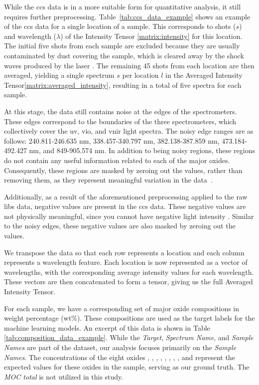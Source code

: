 While the \gls{ccs} data is in a more suitable form for quantitative analysis, it still requires further preprocessing. Table~\ref{tab:ccs_data_example} shows an example of the \gls{ccs} data for a single location of a sample. This corresponds to shots ($s$) and wavelength ($\lambda$) of the Intensity Tensor \ref{matrix:intensity} for this location.
The initial five shots from each sample are excluded because they are usually contaminated by dust covering the sample, which is cleared away by the shock waves produced by the laser \cite{cleggRecalibrationMarsScience2017}.
The remaining 45 shots from each location are then averaged, yielding a single spectrum $s$ per location $l$ in the Averaged Intensity Tensor\ref{matrix:averaged_intensity}, resulting in a total of five spectra for each sample. 

At this stage, the data still contains noise at the edges of the spectrometers.
These edges correspond to the boundaries of the three spectrometers, which collectively cover the \gls{uv}, \gls{vio}, and \gls{vnir} light spectra.
The noisy edge ranges are as follows: 240.811-246.635 nm, 338.457-340.797 nm, 382.138-387.859 nm, 473.184-492.427 nm, and 849-905.574 nm.
In addition to being noisy regions, these regions do not contain any useful information related to each of the major oxides.
Consequently, these regions are masked by zeroing out the values, rather than removing them, as they represent meaningful variation in the data~\cite{cleggRecalibrationMarsScience2017}.

Additionally, as a result of the aforementioned preprocessing applied to the raw \gls{libs} data, negative values are present in the \gls{ccs} data.
These negative values are not physically meaningful, since you cannot have negative light intensity \cite{p9_paper}.
Similar to the noisy edges, these negative values are also masked by zeroing out the values.

We transpose the data so that each row represents a location and each column represents a wavelength feature. 
Each location is now represented as a vector of wavelengths, with the corresponding average intensity values for each wavelength. 
These vectors are then concatenated to form a tensor, giving us the full Averaged Intensity Tensor.

For each sample, we have a corresponding set of major oxide compositions in weight percentage (wt\%).
These compositions are used as the target labels for the machine learning models.
An excerpt of this data is shown in Table \ref{tab:composition_data_example}.
While the \textit{Target}, \textit{Spectrum Name}, and \textit{Sample Names} are part of the dataset, our analysis focuses primarily on the \textit{Sample Names}.
The concentrations of the eight oxides , , , , , , , , and  represent the expected values for these oxides in the sample, serving as our ground truth. The \textit{MOC total} is not utilized in this study.

